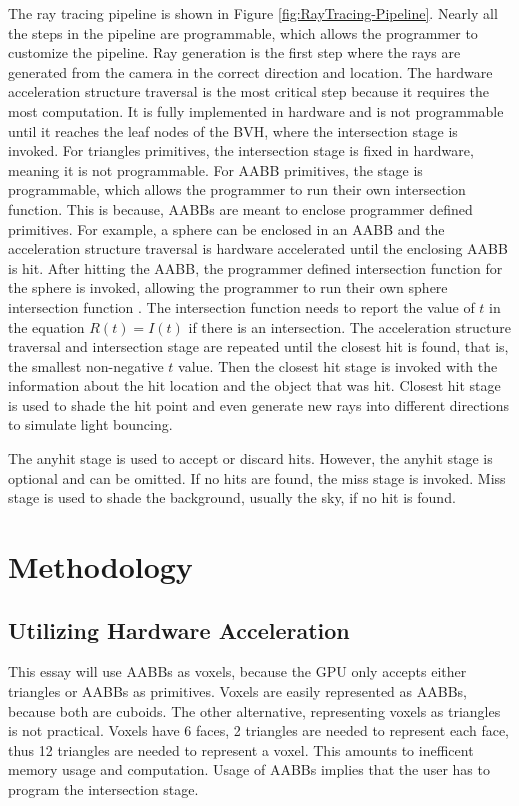 \documentclass[12pt]{article}
\begin{document}
The ray tracing pipeline is shown in Figure \ref{fig:RayTracing-Pipeline}.
Nearly all the steps in the pipeline are programmable, which allows the programmer to customize the pipeline.
Ray generation is the first step where the rays are generated from the camera in the correct direction and location.
The hardware acceleration structure traversal is the most critical step because it requires the most computation.
It is fully implemented in hardware and is not programmable until it reaches the leaf nodes of the BVH, where the intersection stage is invoked.
For triangles primitives, the intersection stage is fixed in hardware, meaning it is not programmable.
For AABB primitives, the stage is programmable, which allows the programmer to run their own intersection function.
This is because, AABBs are meant to enclose programmer defined primitives.
For example, a sphere can be enclosed in an AABB and the acceleration structure traversal is hardware accelerated
until the enclosing AABB is hit. After hitting the AABB, the programmer defined intersection function for the sphere is invoked,
allowing the programmer to run their own sphere intersection function \parencite{NVIDIA:BVH-Patent}.
The intersection function needs to report the value of $t$ in the equation $R(t) = I(t)$ if there is an intersection.
The acceleration structure traversal and intersection stage are repeated until the closest hit is found,
that is, the smallest non-negative $t$ value. Then the closest hit stage is invoked with the information
about the hit location and the object that was hit.
Closest hit stage is used to shade the hit point and even generate new rays into different directions to simulate light bouncing.

The anyhit stage is used to accept or discard hits. However, the anyhit stage is optional and can be omitted.
If no hits are found, the miss stage is invoked.
Miss stage is used to shade the background, usually the sky, if no hit is found.
\parencite{NVIDIA:RTGems2}

\section{Methodology}

\subsection{Utilizing Hardware Acceleration}

This essay will use AABBs as voxels, because the GPU only accepts either triangles or AABBs as primitives.
Voxels are easily represented as AABBs, because both are cuboids.
The other alternative, representing voxels as triangles is not practical. Voxels have 6 faces, 2 triangles
are needed to represent each face, thus 12 triangles are needed to represent a voxel. This amounts to
inefficent memory usage and computation. Usage of AABBs implies that the user has to program the intersection stage.
\end{document}
